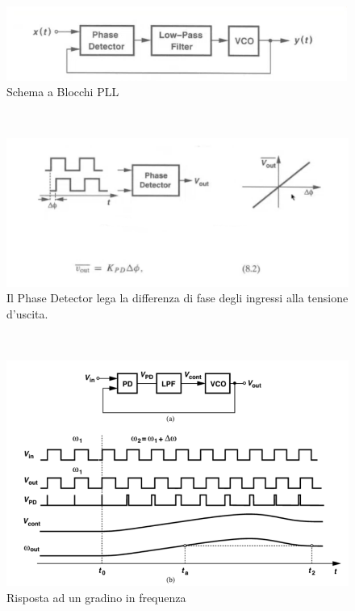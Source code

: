 \documentclass{article}
\begin{document}
~\begin{figure}[!h]%
\includegraphics[scale=1.4]{PLLSchema.png} 
\caption{Schema a Blocchi PLL}
\label{fig:foo}
\end{figure}
~\begin{figure}[H]%
\includegraphics[scale=1]{PhaseDetect.png} 
\caption{Il Phase Detector lega la differenza di fase degli ingressi alla tensione d'uscita.}
\label{fig:foo}
\end{figure}




~\begin{figure}[!h]%
\includegraphics[scale=0.6]{PLLGradino.png} 
\caption{Risposta ad un gradino in frequenza}
\label{fig:foo}
\end{figure}
\end{document}
